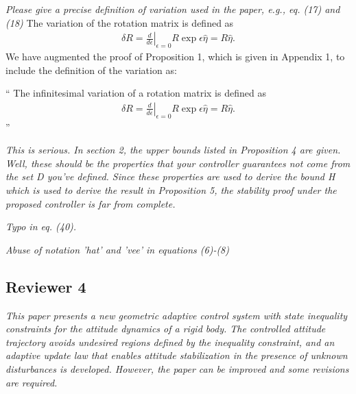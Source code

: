 \documentclass[11pt]{article}
\newcommand{\diff}[2]{\ensuremath{\frac{d #1}{d #2}}}
\newenvironment{correction}{\begin{list}{}{\setlength{\leftmargin}{1cm}\setlength{\rightmargin}{1cm}}\vspace{\parsep}\item[]``}{''\end{list}}
\begin{document}
\begin{enumerate}
\item \textit{Please give a precise definition of variation used in the paper, e.g., eq. (17) and (18)}
The variation of the rotation matrix is defined as
\begin{align*}
    \delta R = \left. \diff{}{\epsilon} \right|_{\epsilon=0} R \exp{\epsilon \hat{\eta}} = R \hat{\eta} .
\end{align*}
We have augmented the proof of Proposition 1, which is given in Appendix 1, to include the definition of the variation as:
\begin{correction}
The infinitesimal variation of a rotation matrix is defined as
\begin{align*}
    \delta R = \left. \diff{}{\epsilon} \right|_{\epsilon=0} R \exp{\epsilon \hat{\eta}} = R \hat{\eta} .
\end{align*}
\end{correction}

\item \textit{This is serious. In section 2, the upper bounds listed in Proposition 4 are given. Well, these should be the properties that your controller guarantees not come from the set D you've defined. Since these properties are used to derive the bound H which is used to derive the result in Proposition 5, the stability proof under the proposed controller is far from complete.}
\item \textit{Typo in eq. (40).}
\item \textit{Abuse of notation 'hat' and 'vee' in equations (6)-(8)}
\end{enumerate}

\subsection*{Reviewer 4}
\textit{This paper presents a new geometric adaptive control system with state inequality constraints for the attitude dynamics of a rigid body. The controlled attitude trajectory avoids undesired regions defined by the inequality constraint, and an adaptive update law that enables attitude stabilization in the presence of unknown disturbances is developed. However, the paper can be improved and some revisions are required.}
\end{document}
